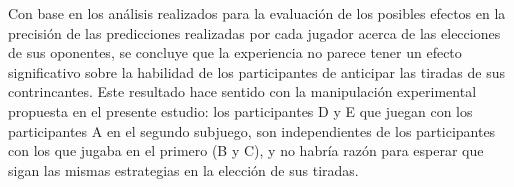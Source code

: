 Con base en los análisis realizados para la evaluación de los posibles efectos en la precisión de las predicciones realizadas por cada jugador acerca de las elecciones de sus oponentes, se concluye que la experiencia no parece tener un efecto significativo sobre la habilidad de los participantes de anticipar las tiradas de sus contrincantes. Este resultado hace sentido con la manipulación experimental propuesta en el presente estudio: los participantes D y E que juegan con los participantes A en el segundo subjuego, son independientes de los participantes con los que jugaba en el primero (B y C), y no habría razón para esperar que sigan las mismas estrategias en la elección de sus tiradas.
	